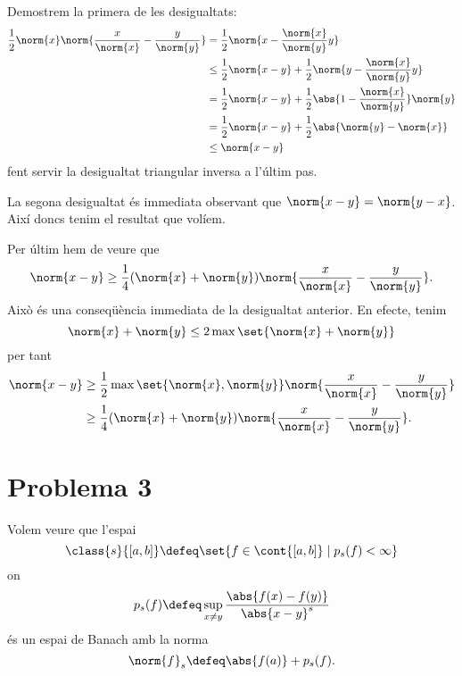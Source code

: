 \documentclass[12pt]{article}
\begin{document}
Demostrem la primera de les desigualtats:
\begin{align*}
	\frac{1}{2} \norm{x} \norm{\frac{x}{\norm{x}} -	\frac{y}{\norm{y}}} 
	& = \frac{1}{2}\norm{x - \frac{\norm{x}}{\norm{y}}y} \\
	& \leq \frac{1}{2}\norm{x - y} + \frac{1}{2}\norm{y - \frac{\norm{x}}{\norm{y}}y} \\
	& = \frac{1}{2}\norm{x - y} + \frac{1}{2}\abs{1 - \frac{\norm{x}}{\norm{y}}}\norm{y} \\
	& = \frac{1}{2}\norm{x - y} + \frac{1}{2}\abs{\norm{y} - \norm{x}} \\
	& \leq \norm{x - y}
\end{align*}
fent servir la desigualtat triangular inversa a l'últim pas.

La segona desigualtat és immediata observant que \( \norm{x - y} = \norm{y - x} \). Així
doncs tenim el resultat que volíem.

\parbreak

Per últim hem de veure que
\begin{equation*}
	\norm{x - y} \geq \frac{1}{4} (\norm{x} + \norm{y}) \norm{\frac{x}{\norm{x}} -
	\frac{y}{\norm{y}}}.
\end{equation*}
Això és una conseqüència immediata de la desigualtat anterior. En efecte, tenim
\begin{equation*}
	\norm{x} + \norm{y} \leq 2 \max\set{\norm{x} + \norm{y}}
\end{equation*}
per tant
\begin{align*}
	\norm{x - y} & \geq \frac{1}{2} \max\set{\norm{x}, \norm{y}} \norm{\frac{x}{\norm{x}} -
	\frac{y}{\norm{y}}} \\
							 & \geq \frac{1}{4} (\norm{x} + \norm{y}) \norm{\frac{x}{\norm{x}} -
	\frac{y}{\norm{y}}}.
\end{align*}

\section*{Problema 3}
Volem veure que l'espai
\begin{equation*}
	\class{s}{[a,b]} \defeq \set{f \in \cont{[a,b]} \mid p_s(f) < \infty}
\end{equation*}
on
\begin{equation*}
	p_s(f) \defeq \sup_{x \neq y} \frac{\abs{f(x) - f(y)}}{\abs{x - y}^s}
\end{equation*}
és un espai de Banach amb la norma
\begin{equation*}
	\norm{f}_s \defeq \abs{f(a)} + p_s(f).
\end{equation*}
\end{document}
